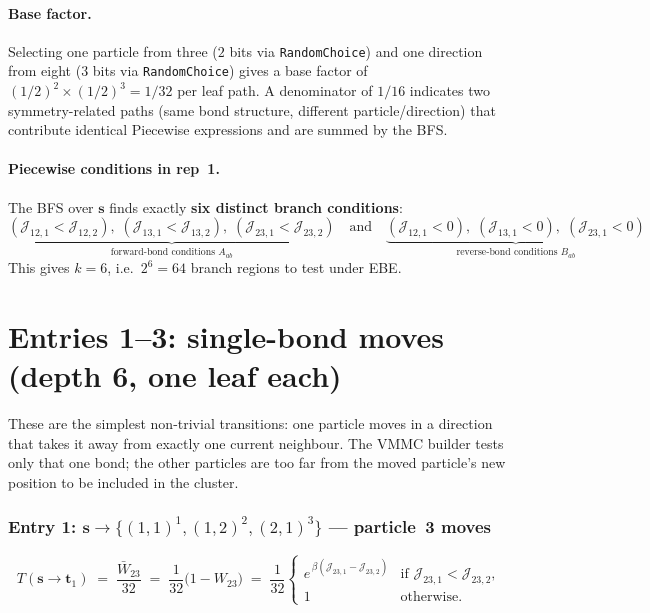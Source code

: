 \documentclass[11pt,a4paper]{article}
\newcommand{\J}[2]{\mathcal{J}_{#1,#2}}
\newcommand{\W}[1]{W_{#1}}
\newcommand{\Wb}[1]{\bar{W}_{#1}}
\newcommand{\s}{\mathbf{s}}
\newcommand{\tp}{\mathbf{t}}
\begin{document}
\paragraph{Base factor.}
Selecting one particle from three ($2$ bits via \texttt{RandomChoice}) and
one direction from eight ($3$ bits via \texttt{RandomChoice}) gives a base
factor of $(1/2)^2\times(1/2)^3 = 1/32$ per leaf path.
A denominator of $1/16$ indicates two symmetry-related paths (same bond
structure, different particle/direction) that contribute identical Piecewise
expressions and are summed by the BFS.

\paragraph{Piecewise conditions in rep~1.}
The BFS over $\s$ finds exactly \textbf{six distinct branch conditions}:
\[
  \underbrace{(\J{12}{1}<\J{12}{2}),\;
              (\J{13}{1}<\J{13}{2}),\;
              (\J{23}{1}<\J{23}{2})}_{\text{forward-bond conditions }A_{ab}}
  \quad\text{and}\quad
  \underbrace{(\J{12}{1}<0),\;
              (\J{13}{1}<0),\;
              (\J{23}{1}<0)}_{\text{reverse-bond conditions }B_{ab}}
\]
This gives $k=6$, i.e.\ $2^6=64$ branch regions to test under EBE.

\section{Entries 1--3: single-bond moves (depth 6, one leaf each)}

These are the simplest non-trivial transitions: one particle moves in a
direction that takes it away from exactly one current neighbour.
The VMMC builder tests only that one bond; the other particles are too far
from the moved particle's new position to be included in the cluster.

\subsubsection*{Entry 1: $\s\to\{(1,1)^1,(1,2)^2,(2,1)^3\}$
  --- particle~3 moves}

\[
  T(\s\to\tp_1) \;=\; \frac{\Wb{23}}{32}
  \;=\; \frac{1}{32}\Biggl(1 - \W{23}\Biggr)
  \;=\;
  \frac{1}{32}
  \begin{cases}
    e^{\,\beta(\J{23}{1}-\J{23}{2})} & \text{if } \J{23}{1}<\J{23}{2},\\
    1 & \text{otherwise.}
  \end{cases}
\]
\end{document}
